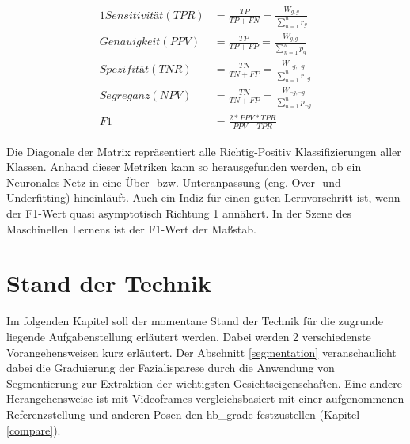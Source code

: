 \begin{alignat}{1}
  Sensitivität (TPR) &= \frac{TP}{TP + FN} = \frac{W_{g, g}}{\sum_{n=1}^{n} r_{g}}\label{eg:tpr}\\
  Genauigkeit (PPV)  &= \frac{TP}{TP + FP} = \frac{W_{g, g}}{\sum_{n=1}^{n} p_{g}}\label{eg:ppv}\\
  Spezifität (TNR)   &= \frac{TN}{TN + FP} = \frac{W_{\neg g, \neg g}}{\sum_{n=1}^{n} r_{\neg g}}\label{eg:tnr}\\
  Segreganz (NPV)    &= \frac{TN}{TN + FP} = \frac{W_{\neg g, \neg g}}{\sum_{n=1}^{n} p_{\neg g}}\label{eg:npr}\\
  F1                 &= \frac{2 * PPV * TPR}{PPV + TPR}\label{eg:f1}
\end{alignat}


Die Diagonale der Matrix repräsentiert alle Richtig-Positiv Klassifizierungen aller Klassen. Anhand dieser Metriken kann so herausgefunden werden, ob ein Neuronales Netz in eine Über- bzw. Unteranpassung (eng. Over- und Underfitting) hineinläuft. Auch ein Indiz für einen guten Lernvorschritt ist, wenn der F1-Wert quasi asymptotisch Richtung 1 annähert. In der Szene des Maschinellen Lernens ist der F1-Wert der Maßstab.


























\chapter{Stand der Technik}\label{std}

Im folgenden Kapitel soll der momentane  Stand der Technik für die zugrunde liegende Aufgabenstellung erläutert werden. Dabei werden 2 verschiedenste Vorangehensweisen kurz erläutert. Der Abschnitt \ref{segmentation} veranschaulicht dabei die Graduierung der Fazialisparese durch die Anwendung von Segmentierung zur Extraktion der wichtigsten Gesichtseigenschaften. Eine andere Herangehensweise ist mit Videoframes vergleichsbasiert mit einer aufgenommenen Referenzstellung und anderen Posen den \ac{hb_grade} festzustellen (Kapitel \ref{compare}).

